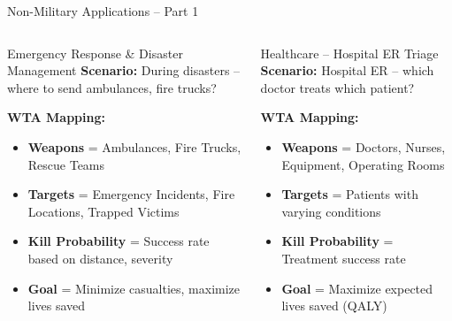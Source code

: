 \documentclass[aspectratio=43,8pt]{beamer}
\begin{document}
\begin{frame}{Non-Military Applications -- Part 1}
\begin{columns}[t]
\begin{alertblock}{Emergency Response \& Disaster Management}
\textbf{Scenario:} During disasters -- where to send ambulances, fire trucks?

\vspace{0.2cm}
\textbf{WTA Mapping:}
\begin{itemize}
    \item \textbf{Weapons} = Ambulances, Fire Trucks, Rescue Teams
    \item \textbf{Targets} = Emergency Incidents, Fire Locations, Trapped Victims
    \item \textbf{Kill Probability} = Success rate based on distance, severity
    \item \textbf{Goal} = Minimize casualties, maximize lives saved
\end{itemize}
\end{alertblock}

\begin{block}{Healthcare -- Hospital ER Triage}
\textbf{Scenario:} Hospital ER -- which doctor treats which patient?

\vspace{0.2cm}
\textbf{WTA Mapping:}
\begin{itemize}
    \item \textbf{Weapons} = Doctors, Nurses, Equipment, Operating Rooms
    \item \textbf{Targets} = Patients with varying conditions
    \item \textbf{Kill Probability} = Treatment success rate
    \item \textbf{Goal} = Maximize expected lives saved (QALY)
\end{itemize}
\end{block}
\end{columns}
\end{frame}
\end{document}
